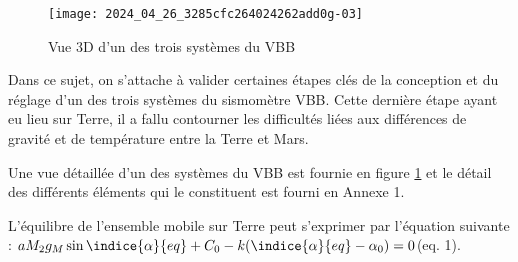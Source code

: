 \begin{figure}[!h]
\centering
\texttt{[image: 2024\_04\_26\_3285cfc264024262add0g-03]}
\caption{\label{ccmp2023_fig_02} Vue 3D d'un des trois systèmes du VBB}
\end{figure}



Dans ce sujet, on s'attache à valider certaines étapes clés de la conception et du réglage d'un des trois systèmes du sismomètre VBB. Cette dernière étape ayant eu lieu sur Terre, il a fallu contourner les difficultés liées aux différences de gravité et de température entre la Terre et Mars.

Une vue détaillée d'un des systèmes du VBB est fournie en figure \ref{ccmp2023_fig_02} et le détail des différents éléments qui le constituent est fourni en Annexe 1.

L’équilibre de l’ensemble mobile sur Terre peut s'exprimer par l'équation suivante : 
$ aM_2 g_M \sin\indice{\alpha}{eq} +C_0 - k( \indice{\alpha}{eq} -\alpha_0)=0 $(eq. 1).
\fi
